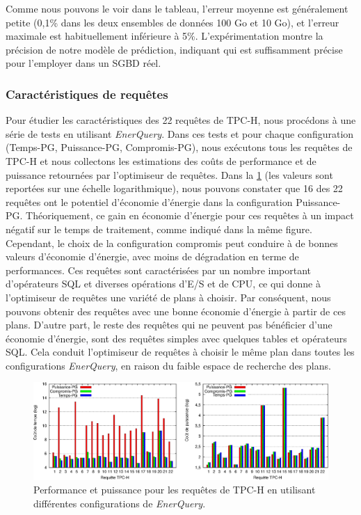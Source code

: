 Comme nous pouvons le voir dans le tableau, l'erreur moyenne est généralement petite (0,1\% dans les deux ensembles de données 100 Go et 10 Go), et l'erreur maximale est habituellement inférieure à 5\%. L'expérimentation montre la précision de notre modèle de prédiction, indiquant qui est suffisamment précise pour l'employer dans un SGBD réel.

\subsubsection{Caractéristiques de requêtes}\label{subsubsec:QueryCharacterization}
Pour étudier les caractéristiques des 22 requêtes de TPC-H, nous procédons à une série de tests en utilisant \textit{EnerQuery}. Dans ces tests et pour chaque configuration (Temps-PG, Puissance-PG, Compromis-PG), nous exécutons tous les requêtes de TPC-H et nous collectons les estimations des coûts de performance et de puissance retournées par l'optimiseur de requêtes. Dans la \ref{fig:tpch-pg-conf} (les valeurs sont reportées sur une échelle logarithmique), nous pouvons constater que 16 des 22 requêtes ont le potentiel d'économie d'énergie dans la configuration Puissance-PG. Théoriquement, ce gain en économie d'énergie pour ces requêtes à un impact négatif sur le temps de traitement, comme indiqué dans la même figure. Cependant, le choix de la configuration compromis peut conduire à de bonnes valeurs d'économie d'énergie, avec moins de dégradation en terme de performances. Ces requêtes sont caractérisées par un nombre important d'opérateurs SQL et diverses opérations d'E/S et de CPU, ce qui donne à l'optimiseur de requêtes une variété de plans à choisir. Par conséquent, nous pouvons obtenir des requêtes avec une bonne économie d'énergie à partir de ces plans. D'autre part, le reste des requêtes qui ne peuvent pas bénéficier d'une économie d'énergie, sont des requêtes simples avec quelques tables et opérateurs SQL. Cela conduit l'optimiseur de requêtes à choisir le même plan dans toutes les configurations \textit{EnerQuery}, en raison du faible espace de recherche des plans.

\begin{figure}
  \centering
  \includegraphics[width=1\textwidth]{chapitre5/chap5Fig/tpch-pg-conf.eps}
  \caption{Performance et puissance pour les requêtes de TPC-H en utilisant différentes configurations de \textit{EnerQuery}.}\label{fig:tpch-pg-conf}
\end{figure}

